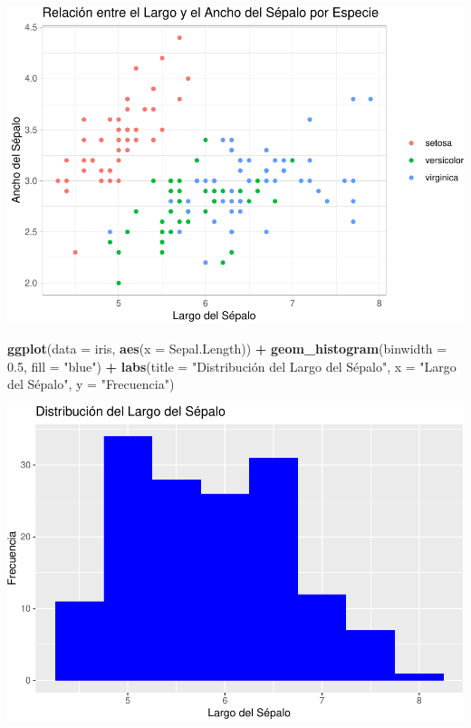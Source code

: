 \documentclass[
]{book}
\newenvironment{Shaded}{\begin{snugshade}}{\end{snugshade}}
\newcommand{\AttributeTok}[1]{\textcolor[rgb]{0.13,0.29,0.53}{#1}}
\newcommand{\FloatTok}[1]{\textcolor[rgb]{0.00,0.00,0.81}{#1}}
\newcommand{\FunctionTok}[1]{\textcolor[rgb]{0.13,0.29,0.53}{\textbf{#1}}}
\newcommand{\NormalTok}[1]{#1}
\newcommand{\SpecialCharTok}[1]{\textcolor[rgb]{0.81,0.36,0.00}{\textbf{#1}}}
\newcommand{\StringTok}[1]{\textcolor[rgb]{0.31,0.60,0.02}{#1}}
\begin{document}
\includegraphics{bookdown-demo_files/figure-latex/unnamed-chunk-196-1.pdf}

\begin{Shaded}
\begin{Highlighting}[]
\FunctionTok{ggplot}\NormalTok{(}\AttributeTok{data =}\NormalTok{ iris, }\FunctionTok{aes}\NormalTok{(}\AttributeTok{x =}\NormalTok{ Sepal.Length)) }\SpecialCharTok{+} 
  \FunctionTok{geom\_histogram}\NormalTok{(}\AttributeTok{binwidth =} \FloatTok{0.5}\NormalTok{, }\AttributeTok{fill =} \StringTok{"blue"}\NormalTok{) }\SpecialCharTok{+}
  \FunctionTok{labs}\NormalTok{(}\AttributeTok{title =} \StringTok{"Distribución del Largo del Sépalo"}\NormalTok{,}
       \AttributeTok{x =} \StringTok{"Largo del Sépalo"}\NormalTok{,}
       \AttributeTok{y =} \StringTok{"Frecuencia"}\NormalTok{)}
\end{Highlighting}
\end{Shaded}

\includegraphics{bookdown-demo_files/figure-latex/unnamed-chunk-197-1.pdf}
\end{document}
